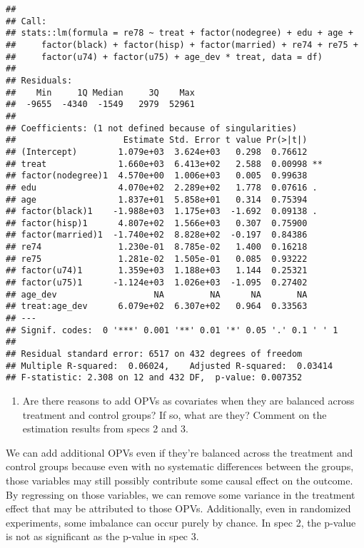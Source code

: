 \documentclass[
]{article}
\providecommand{\tightlist}{%
  \setlength{\itemsep}{0pt}\setlength{\parskip}{0pt}}
\begin{document}
\begin{verbatim}
## 
## Call:
## stats::lm(formula = re78 ~ treat + factor(nodegree) + edu + age + 
##     factor(black) + factor(hisp) + factor(married) + re74 + re75 + 
##     factor(u74) + factor(u75) + age_dev * treat, data = df)
## 
## Residuals:
##    Min     1Q Median     3Q    Max 
##  -9655  -4340  -1549   2979  52961 
## 
## Coefficients: (1 not defined because of singularities)
##                     Estimate Std. Error t value Pr(>|t|)   
## (Intercept)        1.079e+03  3.624e+03   0.298  0.76612   
## treat              1.660e+03  6.413e+02   2.588  0.00998 **
## factor(nodegree)1  4.570e+00  1.006e+03   0.005  0.99638   
## edu                4.070e+02  2.289e+02   1.778  0.07616 . 
## age                1.837e+01  5.858e+01   0.314  0.75394   
## factor(black)1    -1.988e+03  1.175e+03  -1.692  0.09138 . 
## factor(hisp)1      4.807e+02  1.566e+03   0.307  0.75900   
## factor(married)1  -1.740e+02  8.828e+02  -0.197  0.84386   
## re74               1.230e-01  8.785e-02   1.400  0.16218   
## re75               1.281e-02  1.505e-01   0.085  0.93222   
## factor(u74)1       1.359e+03  1.188e+03   1.144  0.25321   
## factor(u75)1      -1.124e+03  1.026e+03  -1.095  0.27402   
## age_dev                   NA         NA      NA       NA   
## treat:age_dev      6.079e+02  6.307e+02   0.964  0.33563   
## ---
## Signif. codes:  0 '***' 0.001 '**' 0.01 '*' 0.05 '.' 0.1 ' ' 1
## 
## Residual standard error: 6517 on 432 degrees of freedom
## Multiple R-squared:  0.06024,    Adjusted R-squared:  0.03414 
## F-statistic: 2.308 on 12 and 432 DF,  p-value: 0.007352
\end{verbatim}

\begin{enumerate}
\def\labelenumi{\alph{enumi}.}
\setcounter{enumi}{1}
\tightlist
\item
  Are there reasons to add OPVs as covariates when they are balanced
  across treatment and control groups? If so, what are they? Comment on
  the estimation results from specs 2 and 3.
\end{enumerate}

We can add additional OPVs even if they're balanced across the treatment
and control groups because even with no systematic differences between
the groups, those variables may still possibly contribute some causal
effect on the outcome. By regressing on those variables, we can remove
some variance in the treatment effect that may be attributed to those
OPVs. Additionally, even in randomized experiments, some imbalance can
occur purely by chance. In spec 2, the p-value is not as significant as
the p-value in spec 3.
\end{document}

